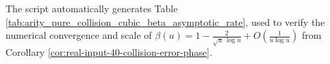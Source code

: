 

\begin{remark}\label{rem:arity-pure-collision-cubic-beta-asymptotic-rate}
The script  automatically generates Table \ref{tab:arity_pure_collision_cubic_beta_asymptotic_rate},
used to verify the numerical convergence and scale of
\(
\beta(u)=1-\frac{2}{\sqrt u\,\log u}+O\!\left(\frac{1}{u\log u}\right)
\)
from Corollary \ref{cor:real-input-40-collision-error-phase}.
\end{remark}





